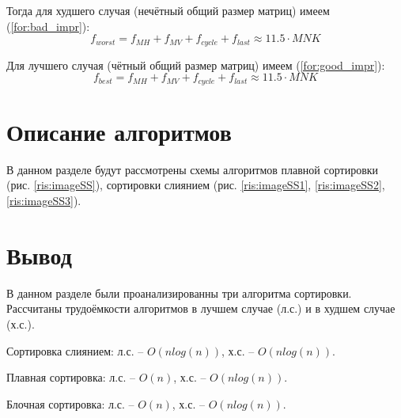 Тогда для худшего случая (нечётный общий размер матриц) имеем (\ref{for:bad_impr}):
\begin{equation}
	\label{for:bad_impr}
	f_{worst} = f_{MH} + f_{MV} + f_{cycle} + f_{last} \approx 11.5 \cdot MNK
\end{equation}

Для лучшего случая (чётный общий размер матриц) имеем (\ref{for:good_impr}):
\begin{equation}
	\label{for:good_impr}
	f_{best} = f_{MH} + f_{MV} + f_{cycle} + f_{last} \approx 11.5 \cdot MNK
\end{equation}

\section{Описание алгоритмов}
В данном разделе будут рассмотрены схемы алгоритмов плавной сортировки (рис. \ref{ris:imageSS}), сортировки слиянием (рис. \ref{ris:imageSS1}, \ref{ris:imageSS2}, \ref{ris:imageSS3}).
\begin{center}
	

\newpage
	\centering
	\def\svgwidth{9cm}
	
	\label{ris:imageSS}
\newpage
	\centering
	\def\svgwidth{8cm}
	
	\label{ris:imageSS1}
\newpage
	\centering
	\def\svgwidth{12cm}
	
	\label{ris:imageSS2}
\newpage
	\centering
		\def\svgwidth{12cm}
	
	\label{ris:imageSS3}

\end{center}
\newpage

\section*{Вывод}
В данном разделе были проанализированны три алгоритма сортировки. Рассчитаны трудоёмкости алгоритмов в лучшем случае (л.с.) и в худшем случае (х.с.).

Сортировка слиянием: л.с. -- $O(nlog(n))$, х.с. -- $O(nlog(n))$.

Плавная сортировка: л.с. -- $O(n)$,  х.с. --  $O(nlog(n))$.

Блочная сортировка: л.с. -- $O(n)$,  х.с. -- $O(nlog(n))$.